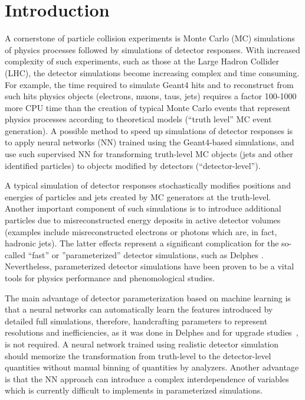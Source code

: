 \documentclass[showpacs,showkeys,preprint,prd,nofootinbib,linenumbers,12pt]{revtex4-1}
\begin{document}
\section{Introduction}

A cornerstone of particle collision experiments is Monte Carlo (MC) simulations of physics processes followed by simulations of detector responses. With increased complexity of such experiments, such as those at the Large Hadron Collider (LHC), the detector simulations become increasing complex and time consuming.  For example, the time required to simulate Geant4 \cite{geant4} hits and to reconstruct from such hits physics objects (electrons, muons, taus, jets) requires a factor 100-1000 more CPU time than the creation of typical Monte Carlo events that represent physics processes according to theoretical models (``truth level'' MC event generation).  A possible method to speed up simulations of detector responses is to apply neural networks (NN) trained using the Geant4-based simulations, and use such supervised NN for transforming truth-level MC objects (jets and other identified particles) to objects modified by detectors (``detector-level'').  

A typical simulation of detector responses stochastically modifies positions and energies of particles and jets created by MC generators at the truth-level. Another important component of such simulations is to introduce additional particles due to misreconstructed energy deposits in active detector volumes  (examples include misreconstructed electrons or photons which are, in fact, hadronic jets). The latter effects represent a significant complication for the so-called ``fast'' or ''parameterized'' detector simulations, such as Delphes \cite{deFavereau:2013fsa}. Nevertheless, parameterized detector simulations have been proven to be a vital tools for physics performance and phenomological studies.

The main advantage of detector parameterization based on machine learning is that a neural networks can automatically learn the features introduced by detailed full simulations, therefore, handcrafting parameters to represent resolutions and inefficiencies, as it was done in Delphes and for upgrade studies~\cite{truthSmearingFunction}, is not required. A neural network trained using realistic detector simulation should memorize the transformation from truth-level to the detector-level quantities without manual binning of quantities by analyzers. Another advantage is that the NN approach can introduce a complex interdependence of variables which is currently difficult to implements in parameterized simulations. %
\end{document}
